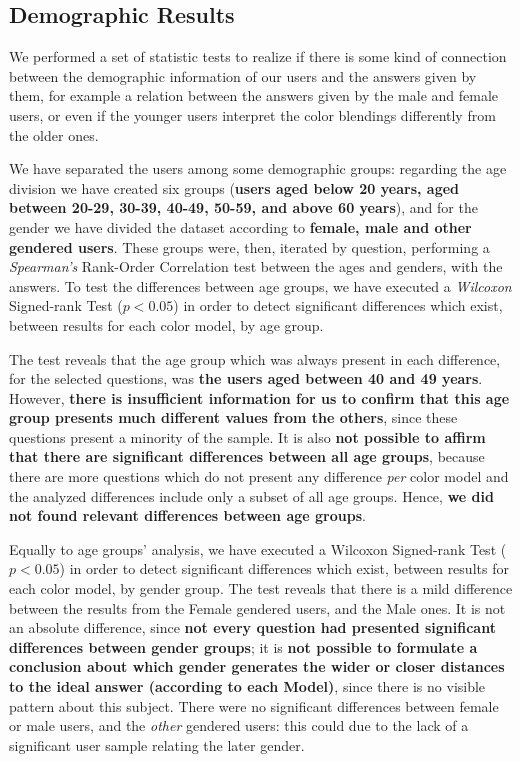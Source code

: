 \subsection{Demographic Results}
%
We performed a set of statistic tests to realize if there is some kind of connection between the
demographic information of our users and the answers given by them, for example a relation between
the answers given by the male and female users, or even if the younger users interpret the color
blendings differently from the older ones. \par
%
We have separated the users among some demographic groups: regarding the age division we have created
six groups (\textbf{users aged below 20 years, aged between 20-29, 30-39, 40-49, 50-59, and above 60 years}),
and for the gender we have divided the dataset according to \textbf{female, male and other gendered users}.
These groups were, then, iterated by question, performing a \emph{Spearman's} Rank-Order Correlation test
between the ages and genders, with the answers. To test the differences between age groups, we have executed
a \emph{Wilcoxon} Signed-rank Test ($p < 0.05$) in order to detect significant differences which exist, between results for each color model, by age group. \par
%
The test reveals that the age group which was always present in each difference, for the selected questions,
was \textbf{the users aged between 40 and 49 years}. However, \textbf{there is insufficient information for
us to confirm that this age group presents much different values from the others}, since these questions
present a minority of the sample. It is also \textbf{not possible to affirm that there are significant
differences between all age groups}, because there are more questions which do not present any difference
\emph{per} color model and the analyzed differences include only a subset of all age groups. Hence,
\textbf{we did not found relevant differences between age groups}. \par
%
Equally to age groups' analysis, we have executed a Wilcoxon Signed-rank Test ($p < 0.05$) in order to
detect significant differences which exist, between results for each color model, by gender group. The
test reveals that there is a mild difference between the results from the Female gendered users, and
the Male ones. It is not an absolute difference, since \textbf{not every question had presented significant
differences between gender groups}; it is \textbf{not possible to formulate a conclusion about which gender
generates the wider or closer distances to the ideal answer (according to each Model)}, since there is no
visible pattern about this subject. There were no significant differences between female
or male users, and the \emph{other} gendered users: this could due to the lack of a significant user sample
relating the later gender.
%
